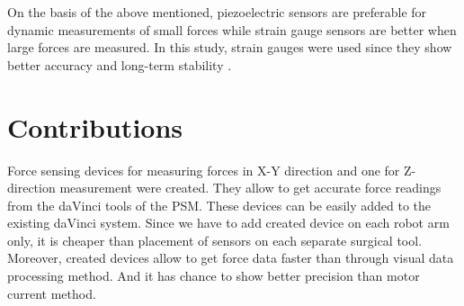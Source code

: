 On the basis of the above mentioned, piezoelectric sensors are preferable for dynamic measurements of small forces while strain gauge sensors are better when large forces are measured. In this study, strain gauges were used since they show better accuracy and long-term stability \cite{SGandP1,SGandP2}.

\section{Contributions}
\label{sec:MyAppr}
Force sensing devices for measuring forces in X-Y direction and one for Z-direction measurement were created. They allow to get accurate force readings from the daVinci tools of the PSM.  These devices can be easily added to the existing daVinci system. Since we have to add created device on each robot arm only, it is cheaper than placement of sensors on each separate surgical tool.  Moreover, created devices allow to get force data faster than through visual data processing method. And it has chance to show better precision than motor current method.
